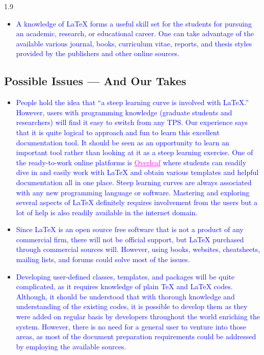 \documentclass[phd]{ndsu-thesis-2022}
\newcommand\myspacing{1.9}      %
\newcommand\italk[1]{\textcolor{blue}{#1}}  %
\newcommand\lx{\LaTeX\xspace}
\newcommand\tx{\TeX\xspace}
\begin{document}
\begin{spacing}{\myspacing}
\begin{itemize}[leftmargin=*, itemsep=0pt, parsep=3pt]
\item \italk{A knowledge of \lx forms a useful skill set for the students for pursuing an academic, research, or educational career. One can take advantage of the available various journal, books, curriculum vitae, reports, and thesis styles provided by the publishers and other online sources.} 

\end{itemize}

\subsection{Possible Issues --- And Our Takes}
\begin{itemize}[leftmargin=*, itemsep=0pt, parsep=3pt] 
\item \italk{People hold the idea that ``a steep learning curve is involved with \lx.'' However, users with programming knowledge (graduate students and researchers) will find it easy to switch from any TPS. Our experience says that it is quite logical to approach and fun to learn this excellent documentation tool. It should be seen as an opportunity to learn an important tool rather than looking at it as a steep learning exercise. One of the ready-to-work online platforms is \href{https://www.overleaf.com/login}{\textcolor{magenta}{\underline{Overleaf}}} where students can readily dive in and easily work with \lx and obtain various templates and helpful documentation all in one place. Steep learning curves are always associated with any new programming language or software. Mastering and exploring several aspects of \lx definitely requires involvement from the users but a lot of help is also readily available in the internet domain.}   

\item \italk{Since \lx is an open source free software that is not a product of any commercial firm, there will not be official support, but \lx purchased through commercial sources will. However, using books, websites, cheatsheets, mailing lists, and forums could solve most of the issues.} 

\item \italk{Developing user-defined classes, templates, and packages will be quite complicated, as it requires knowledge of plain \tx and \lx codes. Although, it should be understood that with thorough knowledge and understanding of the existing codes, it is possible to develop them as they were added on regular basis by developers throughout the world enriching the system. However, there is no need for a general user to venture into those areas, as most of the document preparation requirements could be addressed by employing the available sources.} 


\end{itemize}
\end{spacing}
\end{document}

